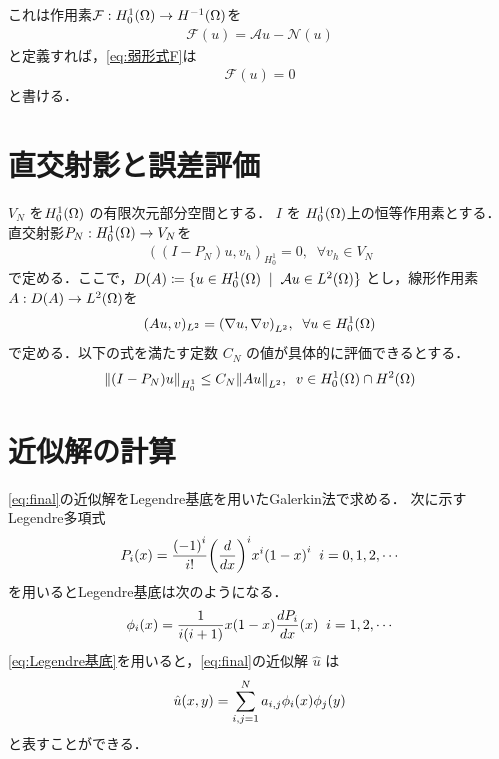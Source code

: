 これは作用素\(\mathcal{F}:H^1_0\qty(\Omega)\rightarrow H^{-1}\qty(\Omega)\)を
\begin{align}
  \mathcal{F}(u) = \mathcal{A}u - \mathcal{N}(u)
\end{align}
と定義すれば，\eqref{eq:弱形式F}は
\begin{align}\label{eq:final}
  \mathcal{F}(u)=0
\end{align}
と書ける．

\section{直交射影と誤差評価}
\(V_N\) を\(H^1_0\qty(\Omega)\) の有限次元部分空間とする．
\(I\) を \(H^1_0\qty(\Omega)\)上の恒等作用素とする． 
直交射影\(P_N:H^1_0\qty(\Omega)\rightarrow V_N\)を
\begin{align}
    ((I-P_N)u,v_h)_{H^1_0}=0,\;\;\forall v_h\in V_N
\end{align}
で定める．ここで，\(D(A) \coloneqq \{u\in H^1_0(\Omega)\;\;|\;\;\mathcal{A}u\in L^2\qty(\Omega)\}\)
とし，線形作用素 \(A:D(A)\rightarrow L^2\qty(\Omega)\)を
\begin{align}
    (Au,v)_{L^2}=\qty(\nabla u, \nabla v)_{L^2}, \;\; \forall u \in H^1_0(\Omega)
\end{align}
で定める．以下の式を満たす定数 \(C_N\) の値が具体的に評価できるとする．
\begin{align}
   \norm{(I-P_N)u}_{H^1_0}\leq C_N\norm{Au}_{L^2}, \;\; v \in H^1_0(\Omega)\cap H^2(\Omega)
\end{align}


\section{近似解の計算}
\eqref{eq:final}の近似解をLegendre基底を用いたGalerkin法で求める．
次に示すLegendre多項式
\begin{align}
   P_i(x)=\dfrac{\qty(-1)^i}{i!}\qty(\dfrac{d}{dx})^i x^i\qty(1-x)^i \;\; i=0,1,2,\cdots
\end{align}
を用いるとLegendre基底は次のようになる．
\begin{align}\label{eq:Legendre基底}
    \phi_i(x)=\dfrac{1}{i\qty(i+1)} x \qty(1-x)\dfrac{dP_i}{dx}\qty(x) 
    \;\; i=1,2,\cdots
\end{align}
\eqref{eq:Legendre基底}を用いると，\eqref{eq:final}の近似解 \(\hat{u}\) は
\begin{align}
   \hat{u}\qty(x,y)=\sum_{i,j=1}^{N}a_{i,j}\phi_i\qty(x)\phi_j\qty(y)
\end{align}
と表すことができる．

